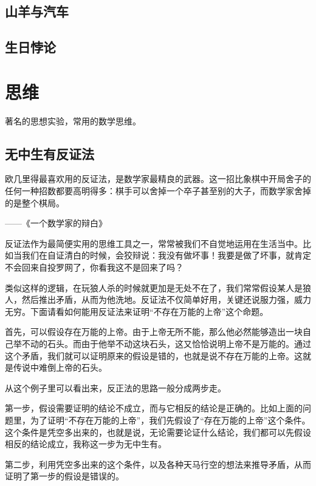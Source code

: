 \documentclass[12pt, letterpaper]{ctexrep}
\newenvironment{shadedquotation}
 {\begin{shaded*}
  \quoting[leftmargin=5pt, rightmargin=5pt, vskip=0pt]
 }
 {\endquoting
 \end{shaded*}
}
\begin{document}
\section{山羊与汽车}


\section{生日悖论}




\chapter{思维}


著名的思想实验，常用的数学思维。

\section{无中生有反证法}
\begin{shadedquotation}
\noindent
欧几里得最喜欢用的反证法，是数学家最精良的武器。这一招比象棋中开局舍子的任何一种招数都要高明得多：棋手可以舍掉一个卒子甚至别的大子，而数学家舍掉的是整个棋局。
\noindent

\noindent
——《一个数学家的辩白》
\end{shadedquotation}


反证法作为最简便实用的思维工具之一，常常被我们不自觉地运用在生活当中。比如当我们在自证清白的时候，会狡辩说：我没有做坏事！我要是做了坏事，就肯定不会回来自投罗网了，你看我这不是回来了吗？

类似这样的逻辑，在玩狼人杀的时候就更加是无处不在了，我们常常假设某人是狼人，然后推出矛盾，从而为他洗地。反证法不仅简单好用，关键还说服力强，威力无穷。下面请看如何能用反证法来证明“不存在万能的上帝”这个命题。

首先，可以假设存在万能的上帝。由于上帝无所不能，那么他必然能够造出一块自己举不动的石头。而由于他举不动这块石头，这又恰恰说明上帝不是万能的。通过这个矛盾，我们就可以证明原来的假设是错的，也就是说不存在万能的上帝。这就是传说中难倒上帝的石头。

从这个例子里可以看出来，反正法的思路一般分成两步走。

第一步，假设需要证明的结论不成立，而与它相反的结论是正确的。比如上面的问题里，为了证明“不存在万能的上帝”，我们先假设了“存在万能的上帝”这个条件。这个条件是凭空多出来的，也就是说，无论需要论证什么结论，我们都可以先假设相反的结论成立，我称这一步为无中生有。

第二步，利用凭空多出来的这个条件，以及各种天马行空的想法来推导矛盾，从而证明了第一步的假设是错误的。
\end{document}
